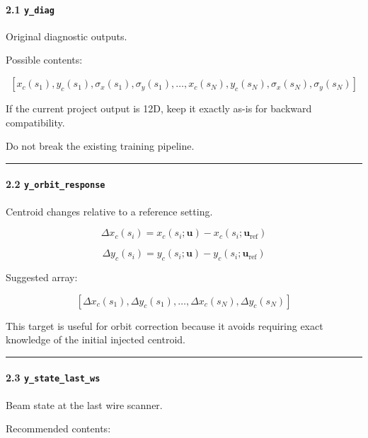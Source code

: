 \documentclass[
]{article}
\begin{document}
\hypertarget{y_diag}{%
\paragraph{\texorpdfstring{2.1
\texttt{y\_diag}}{2.1 y\_diag}}\label{y_diag}}

Original diagnostic outputs.

Possible contents:

\[
[
x_c(s_1),y_c(s_1),\sigma_x(s_1),\sigma_y(s_1),
\ldots,
x_c(s_N),y_c(s_N),\sigma_x(s_N),\sigma_y(s_N)
]
\]

If the current project output is 12D, keep it exactly as-is for backward
compatibility.

Do not break the existing training pipeline.

\begin{center}\rule{0.5\linewidth}{0.5pt}\end{center}

\hypertarget{y_orbit_response}{%
\paragraph{\texorpdfstring{2.2
\texttt{y\_orbit\_response}}{2.2 y\_orbit\_response}}\label{y_orbit_response}}

Centroid changes relative to a reference setting.

\[
\Delta x_c(s_i)
=
x_c(s_i;\mathbf{u})
-
x_c(s_i;\mathbf{u}_{\mathrm{ref}})
\]

\[
\Delta y_c(s_i)
=
y_c(s_i;\mathbf{u})
-
y_c(s_i;\mathbf{u}_{\mathrm{ref}})
\]

Suggested array:

\[
[
\Delta x_c(s_1),\Delta y_c(s_1),\ldots,
\Delta x_c(s_N),\Delta y_c(s_N)
]
\]

This target is useful for orbit correction because it avoids requiring
exact knowledge of the initial injected centroid.

\begin{center}\rule{0.5\linewidth}{0.5pt}\end{center}

\hypertarget{y_state_last_ws}{%
\paragraph{\texorpdfstring{2.3
\texttt{y\_state\_last\_ws}}{2.3 y\_state\_last\_ws}}\label{y_state_last_ws}}

Beam state at the last wire scanner.

Recommended contents:
\end{document}
